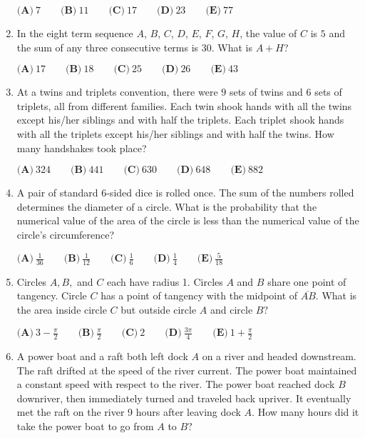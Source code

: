 \documentclass{article}
\begin{document}
\begin{enumerate}[label=\arabic*., itemsep=0.5em]
$
\textbf{(A)}\ 7 \qquad
\textbf{(B)}\ 11 \qquad
\textbf{(C)}\ 17 \qquad
\textbf{(D)}\ 23 \qquad
\textbf{(E)}\ 77 $\par \vspace{0.5em}\item In the eight term sequence $A$, $B$, $C$, $D$, $E$, $F$, $G$, $H$, the value of $C$ is $5$ and the sum of any three consecutive terms is $30$. What is $A+H$?

$
\textbf{(A)}\ 17 \qquad
\textbf{(B)}\ 18 \qquad
\textbf{(C)}\ 25 \qquad
\textbf{(D)}\ 26 \qquad
\textbf{(E)}\ 43 $\par \vspace{0.5em}\item At a twins and triplets convention, there were $9$ sets of twins and $6$ sets of triplets, all from different families. Each twin shook hands with all the twins except his/her siblings and with half the triplets. Each triplet shook hands with all the triplets except his/her siblings and with half the twins. How many handshakes took place?

$
\textbf{(A)}\ 324 \qquad
\textbf{(B)}\ 441 \qquad
\textbf{(C)}\ 630 \qquad
\textbf{(D)}\ 648 \qquad
\textbf{(E)}\ 882 $\par \vspace{0.5em}\item A pair of standard $6$-sided dice is rolled once. The sum of the numbers rolled determines the diameter of a circle. What is the probability that the numerical value of the area of the circle is less than the numerical value of the circle's circumference?

$
\textbf{(A)}\ \frac{1}{36} \qquad
\textbf{(B)}\ \frac{1}{12} \qquad
\textbf{(C)}\ \frac{1}{6} \qquad
\textbf{(D)}\ \frac{1}{4} \qquad
\textbf{(E)}\ \frac{5}{18} $\par \vspace{0.5em}\item Circles $A, B,$ and $C$ each have radius 1. Circles $A$ and $B$ share one point of tangency. Circle $C$ has a point of tangency with the midpoint of $\overline{AB}.$ What is the area inside circle $C$ but outside circle $A$ and circle $B?$

$
\textbf{(A)}\ 3 - \frac{\pi}{2} \qquad
\textbf{(B)}\ \frac{\pi}{2} \qquad
\textbf{(C)}\  2 \qquad
\textbf{(D)}\ \frac{3\pi}{4} \qquad
\textbf{(E)}\ 1+\frac{\pi}{2} $\par \vspace{0.5em}\item A power boat and a raft both left dock $A$ on a river and headed downstream. The raft drifted at the speed of the river current. The power boat maintained a constant speed with respect to the river. The power boat reached dock $B$ downriver, then immediately turned and traveled back upriver. It eventually met the raft on the river 9 hours after leaving dock $A.$ How many hours did it take the power boat to go from $A$ to $B?$


\end{enumerate}
\end{document}
